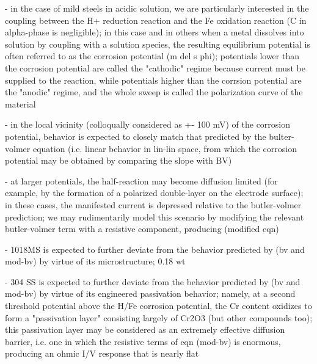 - in the case of mild steels in acidic solution, we are particularly interested in the coupling between the H+ reduction reaction and the Fe oxidation reaction (C in alpha-phase is negligible); in this case and in others when a metal dissolves into solution by coupling with a solution species, the resulting equilibrium potential is often referred to as the corrosion potential (m del s phi); potentials lower than the corrosion potential are called the "cathodic" regime because current must be supplied to the reaction, while potentials higher than the corrsion potential are the "anodic" regime, and the whole sweep is called the polarization curve of the material

- in the local vicinity (colloqually considered as +- 100 mV) of the corrosion potential, behavior is expected to closely match that predicted by the bulter-volmer equation (i.e. linear behavior in lin-lin space, from which the corrosion potential may be obtained by comparing the slope with BV)

- at larger potentials, the half-reaction may become diffusion limited (for example, by the formation of a polarized double-layer on the electrode surface); in these cases, the manifested current is depressed relative to the butler-volmer prediction; we may rudimentarily model this scenario by modifying the relevant butler-volmer term with a resistive component, producing (modified eqn)

- 1018MS is expected to further deviate from the behavior predicted by (bv and mod-bv) by virtue of its microstructure; 0.18 wt%

- 304 SS is expected to further deviate from the behavior predicted by (bv and mod-bv) by virtue of its engineered passivation behavior; namely, at a second threshold potential above the H/Fe corrosion potential, the Cr content oxidizes to form a "passivation layer" consisting largely of Cr2O3 (but other compounds too); this passivation layer may be considered as an extremely effective diffusion barrier, i.e. one in which the resistive terms of eqn (mod-bv) is enormous, producing an ohmic I/V response that is nearly flat

